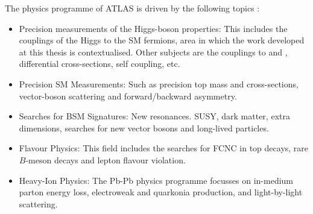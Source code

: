 
 The physics programme of ATLAS is driven by the following topics \cite{CERN-LHCC-2017-020}:
 \begin{itemize}
 	\item Precision measurements of the Higgs-boson properties: This includes the couplings of the Higgs to the SM fermions, area in
		which the work developed at this thesis is contextualised. Other subjects are the couplings to \PW and \PZ, 
		differential cross-sections, self coupling, etc.
		
	\item Precision SM Measurements: Such as precision top mass and cross-sections, vector-boson scattering and forward/backward asymmetry.

	\item Searches for BSM Signatures: New resonances. SUSY,  dark matter, extra dimensions, searches for new vector bosons and long-lived particles.

	\item Flavour Physics: This field includes the searches for FCNC in top decays, rare $B$-meson decays and lepton flavour violation.

	\item Heavy-Ion Physics: The Pb-Pb physics programme focusses on in-medium parton energy loss, 
		electroweak and quarkonia production, and light-by-light scattering.

 \end{itemize} 
 
